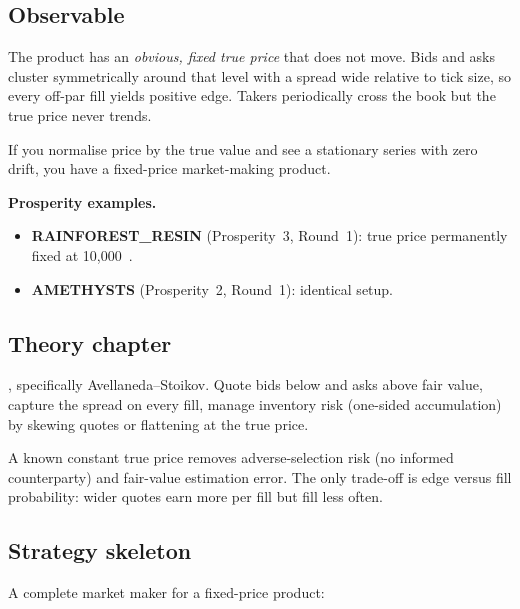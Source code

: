 \subsection{Observable}

The product has an \emph{obvious, fixed true price} that does not
move.  Bids and asks cluster symmetrically around that level with a
spread wide relative to tick size, so every off-par fill yields
positive edge.  Takers periodically cross the book but the true price
never trends.

\begin{keyfactbox}[Diagnostic]
If you normalise price by the true value and see a stationary series
with zero drift, you have a fixed-price market-making product.
\end{keyfactbox}

\noindent
\textbf{Prosperity examples.}
\begin{itemize}
  \item \textbf{RAINFOREST\_RESIN} (Prosperity~3, Round~1): true price
  permanently fixed at 10{,}000~\citep{frankfurthedgehogs2025}.
  \item \textbf{AMETHYSTS} (Prosperity~2, Round~1): identical setup.
\end{itemize}

\subsection{Theory chapter}

, specifically Avellaneda--Stoikov.  Quote
bids below and asks above fair value, capture the spread on every
fill, manage inventory risk (one-sided accumulation) by skewing
quotes or flattening at the true price.

A known constant true price removes adverse-selection risk (no
informed counterparty) and fair-value estimation error.  The only
trade-off is edge versus fill probability: wider quotes earn more per
fill but fill less often.

\subsection{Strategy skeleton}

A complete market maker for a fixed-price product:

